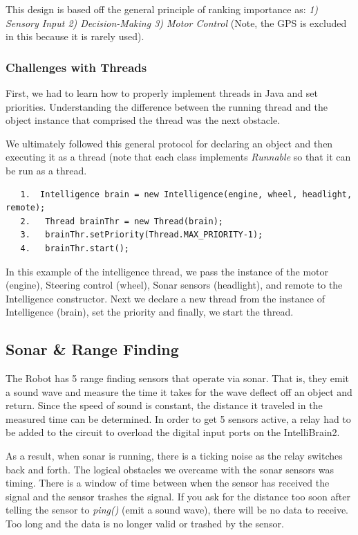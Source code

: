 \documentclass[12pt]{article}
\begin{document}
This design is based off the general principle of ranking importance as: \textit{1) Sensory Input 2) Decision-Making 3) Motor Control}  (Note, the GPS is excluded in this because it is rarely used).

\subsubsection*{Challenges with Threads}
First, we had to learn how to properly implement threads in Java and set priorities.  Understanding the difference between the running thread and the object instance that comprised the thread was the next obstacle.  

We ultimately followed this general protocol for declaring an object and then executing it as a thread (note that each class implements \textit{Runnable} so that it can be run as a thread.

\begin{verbatim}
   1.  Intelligence brain = new Intelligence(engine, wheel, headlight, remote);
   2.   Thread brainThr = new Thread(brain);
   3.   brainThr.setPriority(Thread.MAX_PRIORITY-1);
   4.   brainThr.start();
\end{verbatim}

In this example of the intelligence thread, we pass the instance of the motor (engine), Steering control (wheel), Sonar sensors (headlight), and remote to the Intelligence constructor.  Next we declare a new thread from the instance of Intelligence (brain), set the priority and finally, we start the thread.

\clearpage
\subsection{Sonar \& Range Finding}
The Robot has 5 range finding sensors that operate via sonar.  That is, they emit a sound wave and measure the time it takes for the wave deflect off an object and return.  Since the speed of sound is constant, the distance it traveled in the measured time can be determined.  In order to get 5 sensors active, a relay had to be added to the circuit to overload the digital input ports on the IntelliBrain2.

	As a result, when sonar is running, there is a ticking noise as the relay switches back and forth.  The logical obstacles we overcame with the sonar sensors was timing.  There is a window of time between when the sensor has received the signal and the sensor trashes the signal.  If you ask for the distance too soon after telling the sensor to \textit{ping()} (emit a sound wave), there will be no data to receive.  Too long and the data is no longer valid or trashed by the sensor.
\end{document}
